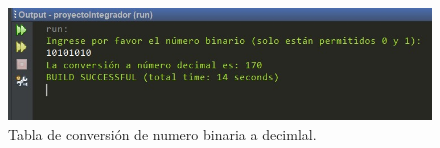 \begin{figure}[h!]
    \centering
    \includegraphics[width = 7.5 cm]{LaTeX/latex-imagenes/fig.2.jpeg}
    \caption{Tabla de conversión de numero binaria a decimlal.}
    \label{fig:DepuraciónCodigo}
\end{figure}